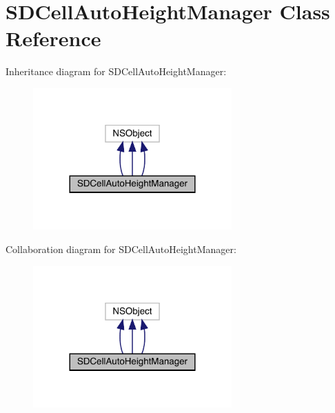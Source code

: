 \hypertarget{interface_s_d_cell_auto_height_manager}{}\section{S\+D\+Cell\+Auto\+Height\+Manager Class Reference}
\label{interface_s_d_cell_auto_height_manager}


Inheritance diagram for S\+D\+Cell\+Auto\+Height\+Manager\+:\nopagebreak
\begin{figure}[H]
\begin{center}
\leavevmode
\includegraphics[width=216pt]{interface_s_d_cell_auto_height_manager__inherit__graph}
\end{center}
\end{figure}


Collaboration diagram for S\+D\+Cell\+Auto\+Height\+Manager\+:\nopagebreak
\begin{figure}[H]
\begin{center}
\leavevmode
\includegraphics[width=216pt]{interface_s_d_cell_auto_height_manager__coll__graph}
\end{center}
\end{figure}
